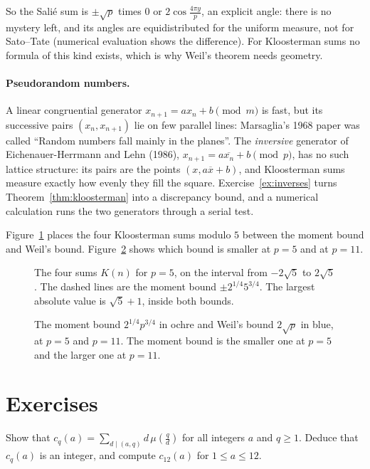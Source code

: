 So the Salié sum is $\pm\sqrt p$ times $0$ or $2\cos\frac{4\pi y}p$, an explicit angle: there is no mystery left, and its angles are equidistributed for the uniform measure, not for Sato--Tate (numerical evaluation shows the difference). For Kloosterman sums no formula of this kind exists, which is why Weil's theorem needs geometry.

\paragraph{Pseudorandom numbers.} A linear congruential generator $x_{n+1}=ax_n+b\pmod m$ is fast, but its successive pairs $(x_n,x_{n+1})$ lie on few parallel lines: Marsaglia's 1968 paper was called ``Random numbers fall mainly in the planes''. The \emph{inversive} generator of Eichenauer-Herrmann and Lehn (1986), $x_{n+1}=a\overline{x_n}+b\pmod p$, has no such lattice structure: its pairs are the points $(x,a\overline x+b)$, and Kloosterman sums measure exactly how evenly they fill the square. Exercise~\ref{ex:inverses} turns Theorem~\ref{thm:kloosterman} into a discrepancy bound, and a numerical calculation runs the two generators through a serial test.

Figure~\ref{fig:v14-extra-05-a} places the four Kloosterman sums modulo $5$ between the moment bound and Weil's bound. Figure~\ref{fig:v14-extra-05-b} shows which bound is smaller at $p=5$ and at $p=11$.

\begin{figure}[ht]
\centering
{}
\caption{The four sums $K(n)$ for $p=5$, on the interval from $-2\sqrt5$ to $2\sqrt5$. The dashed lines are the moment bound $\pm2^{1/4}5^{3/4}$. The largest absolute value is $\sqrt5+1$, inside both bounds.}
\label{fig:v14-extra-05-a}
\end{figure}

\begin{figure}[ht]
\centering
{}
\caption{The moment bound $2^{1/4}p^{3/4}$ in ochre and Weil's bound $2\sqrt p$ in blue, at $p=5$ and $p=11$. The moment bound is the smaller one at $p=5$ and the larger one at $p=11$.}
\label{fig:v14-extra-05-b}
\end{figure}

\section{Exercises}

\begin{exercise}[$\star$]\label{ex:ramanujan}
Show that $c_q(a)=\sum_{d\mid(a,q)}d\,\mu(\frac qd)$ for all integers $a$ and $q\ge1$. Deduce that $c_q(a)$ is an integer, and compute $c_{12}(a)$ for $1\le a\le12$.
\end{exercise}

